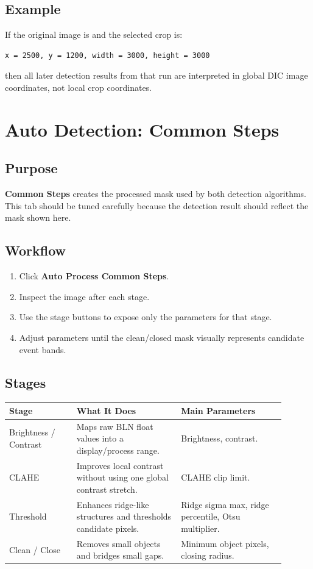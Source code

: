 \documentclass[11pt]{article}
\newcommand{\ui}[1]{\textbf{#1}}
\newcommand{\code}[1]{\texttt{\detokenize{#1}}}
\begin{document}
\subsection{Example}

If the original image is \code{10588 x 5986} and the selected crop is:

\begin{verbatim}
x = 2500, y = 1200, width = 3000, height = 3000
\end{verbatim}

then all later detection results from that run are interpreted in global DIC image coordinates, not local crop coordinates.

\section{Auto Detection: Common Steps}

\subsection{Purpose}

\ui{Common Steps} creates the processed mask used by both detection algorithms. This tab should be tuned carefully because the detection result should reflect the mask shown here.

\subsection{Workflow}

\begin{enumerate}
    \item Click \ui{Auto Process Common Steps}.
    \item Inspect the image after each stage.
    \item Use the stage buttons to expose only the parameters for that stage.
    \item Adjust parameters until the clean/closed mask visually represents candidate event bands.
\end{enumerate}

\subsection{Stages}

\begin{longtable}{p{0.22\linewidth}p{0.34\linewidth}p{0.34\linewidth}}
\toprule
\textbf{Stage} & \textbf{What It Does} & \textbf{Main Parameters} \\
\midrule
Brightness / Contrast & Maps raw BLN float values into a display/process range. & Brightness, contrast. \\
CLAHE & Improves local contrast without using one global contrast stretch. & CLAHE clip limit. \\
Threshold & Enhances ridge-like structures and thresholds candidate pixels. & Ridge sigma max, ridge percentile, Otsu multiplier. \\
Clean / Close & Removes small objects and bridges small gaps. & Minimum object pixels, closing radius. \\
\bottomrule
\end{longtable}
\end{document}
